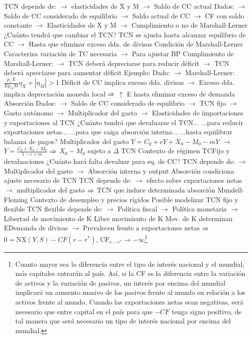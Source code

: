 \documentclass{nuevotema}
\begin{document}
\begin{esquemal}
				\4 TCN depende de:
				\4[] $\to$ elasticidades de X y M
				\4[] $\to$ Saldo de CC actual
				\4 Dados:
				\4[] $\to$ Saldo de CC considerado de equilibrio
				\4[] $\to$ Saldo actual de CC
				\4[] $\to$ CF con saldo constante
				\4[] $\to$ Elasticidades de X y M
				\4[] $\to$ Cumplimiento o no de Marshall-Lerner
				\4[$\then$] ¿Cuánto tendrá que cambiar el TCN?
				\4 TCN se ajusta hasta alcanzar equilibrio de CC
				\4[] $\to$ Hasta que eliminar exceso dda. de divisas
				\4 Condición de Marshall-Lerner
				\4[] Caracteriza variación de TC necesaria
				\4[] $\to$ Para ajustar BP
				\4[] Cumplimiento de Marshall-Lerner:
				\4[] $\to$ TCN deberá depreciarse para reducir déficit
				\4[] $\to$ TCN deberá apreciarse para aumentar déficit
				\4 Ejemplo:
				\4[] Dado:
				\4[] $\to$ Marshall-Lerner: $\frac{p_x X}{E p_m M } \eta_X + \left| \eta_M \right| > 1$
				\4[] Déficit de CC implica exceso dda. divisas
				\4[] $\to$ Exceso dda. implica depreciación moneda local
				\4[] $\then$ $\uparrow$ E hasta eliminar exceso de demanda
			\3 Absorción
				\4 Dados:
				\4[] $\to$ Saldo de CC considerado de equilibrio
				\4[] $\to$ TCN fijo
				\4[] $\to$ Gasto autónomo
				\4[] $\to$ Multiplicador del gasto
				\4[] $\to$ Elasticidades de importaciones y exportaciones al TCN
				\4[$\then$] ¿Cuánto tendrá que devaluarse el TCN...
				\4[] ...para reducir exportaciones netas...
				\4[] ...para que caiga absorción interna...
				\4[] ...hasta equilibrar balanza de pagos?
				\4 Multiplicador del gasto
				\4[] $Y = C_0 + cY + X_0 - M_0 - mY$
				\4[] $\to$ $Y = \frac{C_0 + X_0 - M_0}{1-c+m}$
				\4[] $\then$ $X_0 - M_0$ sujeto a $\Delta$ TCN
				\4 Contexto de régimen TCFijo y devaluaciones
				\4[] ¿Cuánto hará falta devaluar para eq. de CC?
				\4 TCN depende de:
				\4[] $\to$ Multiplicador del gasto
				\4[] $\to$ Absorción interna y output
				\4 Absorción condiciona ajuste necesario de TCN
				\4[] TCN depende de:
				\4[] $\to$ efecto sobre exportaciones netas
				\4[] $\to$ multiplicador del gasto
				\4[] $\then$ TCN que induce determinada absorción
			\3 Mundell-Fleming
				\4 Contexto de desempleo y precios rígidos
				\4[] Posible modelizar TCN fijo y flexible
				\4 TCN flexible depende de:
				\4[] $\to$ Política fiscal
				\4[] $\to$ Política monetaria
				\4[] $\to$ Libertad de movimiento de K
				\4 Libre movimiento de K
				\4[] Mov. de K determinan EDemanda de divisas
				\4[] $\to$ Prevalecen frente a exportaciones netas
				\4[] $\then$ $0=\text{NX}(Y,S) - CF(r - r^*)$, $\text{CF}_{r-r^*} \to -\infty$\footnote{Cuanto mayor sea la diferencia entre el tipo de interés nacional y el mundial, más capitales entrarán al país. Así, si la CF es la diferencia entre la variación de activos y la variación de pasivos, un interés por encima del mundial implicará un aumento masivo de los pasivos frente al mundo en relación a los activos frente al mundo. Cuando las exportaciones netas sean negativas, será necesario que entre capital en el país para que $-CF$ tenga signo positivo, de tal manera que será necesario un tipo de interés nacional por encima del mundial.}

\end{esquemal}
\end{document}
